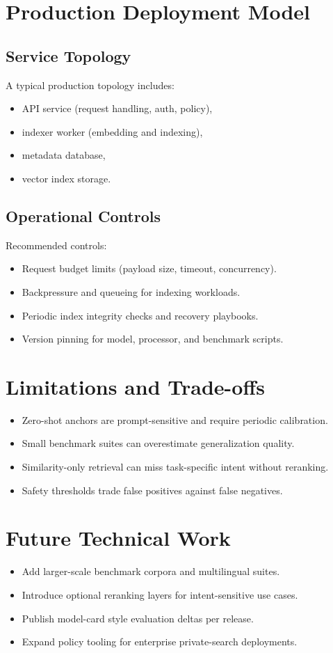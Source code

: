 \documentclass[11pt]{article}
\begin{document}
\section{Production Deployment Model}
\subsection{Service Topology}
A typical production topology includes:
\begin{itemize}[leftmargin=1.2em]
  \item API service (request handling, auth, policy),
  \item indexer worker (embedding and indexing),
  \item metadata database,
  \item vector index storage.
\end{itemize}

\subsection{Operational Controls}
Recommended controls:
\begin{itemize}[leftmargin=1.2em]
  \item Request budget limits (payload size, timeout, concurrency).
  \item Backpressure and queueing for indexing workloads.
  \item Periodic index integrity checks and recovery playbooks.
  \item Version pinning for model, processor, and benchmark scripts.
\end{itemize}

\section{Limitations and Trade-offs}
\begin{itemize}[leftmargin=1.2em]
  \item Zero-shot anchors are prompt-sensitive and require periodic calibration.
  \item Small benchmark suites can overestimate generalization quality.
  \item Similarity-only retrieval can miss task-specific intent without reranking.
  \item Safety thresholds trade false positives against false negatives.
\end{itemize}

\section{Future Technical Work}
\begin{itemize}[leftmargin=1.2em]
  \item Add larger-scale benchmark corpora and multilingual suites.
  \item Introduce optional reranking layers for intent-sensitive use cases.
  \item Publish model-card style evaluation deltas per release.
  \item Expand policy tooling for enterprise private-search deployments.
\end{itemize}
\end{document}
